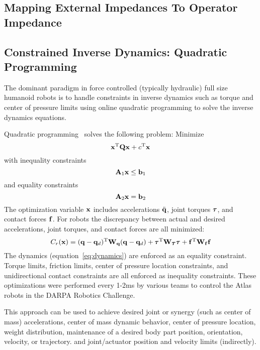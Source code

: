 \documentclass[letterpaper,12pt,fullpage]{article}
\begin{document}
\subsection{Mapping External Impedances To Operator Impedance}

\subsection{Constrained Inverse Dynamics: Quadratic Programming}

The dominant paradigm in force controlled (typically
hydraulic) full size humanoid robots is to handle constraints in inverse dynamics
such as torque and center of pressure limits using online quadratic programming
to solve the inverse dynamics equations.

Quadratic programming~\cite{Wikipedia} solves the following problem:
Minimize
\begin{equation}
{\bf x}^{{\rm T}} {\bf Q} {\bf x} + c^{{\rm T}} {\bf x}
\end{equation}
with inequality constraints
\begin{equation}
{\bf A}_1 {\bf x} \le {\bf b}_1
\end{equation}
and equality constraints
\begin{equation}
{\bf A}_2 {\bf x} = {\bf b}_2
\end{equation}
The optimization variable ${\bf x}$ includes accelerations $\ddot{{\bf q}}$, joint
torques $\vtau$, and contact forces ${\bf f}$.
For robots the discrepancy between actual and desired accelerations, joint
torques, and contact forces are all minimized:
\begin{equation}
C_r(\vx) = (\vq - \vq_d)^{\tr} \mW_{\vq} (\vq - \vq_d) + \vtau^{\tr} \mW_{\vtau} \vtau
+ \vf^{\tr} \mW_{\vf} \vf
\end{equation}
The dynamics (equation~\ref{eq:dynamics}) are enforced as an equality constraint.
Torque limits, friction limits, center of pressure location constraints,
and unidirectional contact constraints are all
enforced as inequality constraints.
These optimizations were performed every 1-2ms by various teams to control the
Atlas robots in the DARPA Robotics Challenge.

This approach can be used to achieve desired joint or synergy (such as center
of mass) accelerations, center of mass dynamic behavior, center of pressure location,
weight distribution, maintenance of a desired body part position, orientation,
velocity, or trajectory. and joint/actuator position and velocity limits (indirectly).
\end{document}

